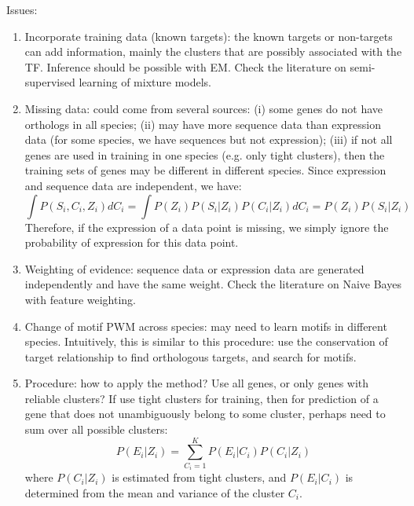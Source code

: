 \documentclass[11pt]{article}
\begin{document}
\begin{enumerate}
\begin{enumerate}
\end{enumerate}


Issues: 
\begin{enumerate}

\item Incorporate training data (known targets): the known targets or non-targets can add information, mainly the clusters that are possibly associated with the TF. Inference should be possible with EM. Check the literature on semi-supervised learning of mixture models. 

\item Missing data: could come from several sources: (i) some genes do not have orthologs in all species; (ii) may have more sequence data than expression data (for some species, we have sequences but not expression); (iii) if not all genes are used in training in one species (e.g. only tight clusters), then the training sets of genes may be different in different species. Since expression and sequence data are independent, we have: 
\begin{equation}
\int{P(S_i,C_i,Z_i)dC_i} = \int{P(Z_i) P(S_i|Z_i) P(C_i|Z_i) dC_i} = P(Z_i) P(S_i|Z_i)
\end{equation}
Therefore, if the expression of a data point is missing, we simply ignore the probability of expression for this data point. 

\item Weighting of evidence: sequence data or expression data are generated independently and have the same weight. Check the literature on Naive Bayes with feature weighting. 

\item Change of motif PWM across species: may need to learn motifs in different species. Intuitively, this is similar to this procedure: use the conservation of target relationship to find orthologous targets, and search for motifs. 

\item Procedure: how to apply the method? Use all genes, or only genes with reliable clusters? If use tight clusters for training, then for prediction of a gene that does not unambiguously belong to some cluster, perhaps need to sum over all possible clusters: 
\begin{equation}
P(E_i|Z_i) = \sum_{C_i=1}^K P(E_i|C_i) P(C_i|Z_i)
\end{equation} 
where $P(C_i|Z_i)$ is estimated from tight clusters, and $P(E_i|C_i)$ is determined from the mean and variance of the cluster $C_i$. 


\end{enumerate}
\end{enumerate}
\end{document}
